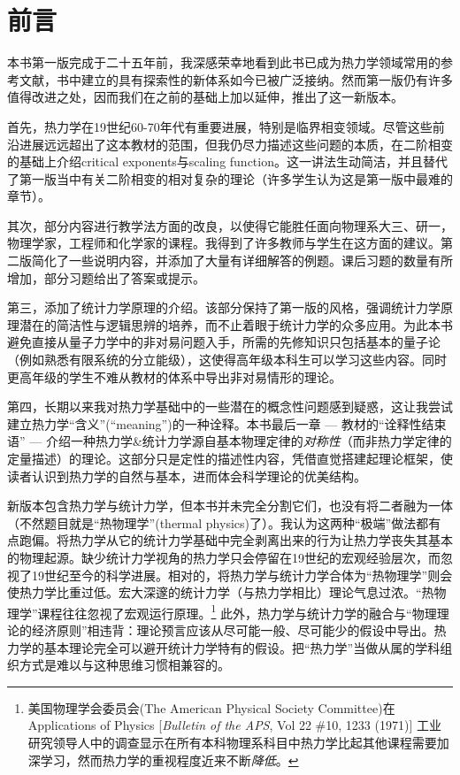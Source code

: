 

\chapter*{前言}
本书第一版完成于二十五年前，我深感荣幸地看到此书已成为热力学领域常用的参考文献，书中建立的具有探索性的新体系如今已被广泛接纳。然而第一版仍有许多值得改进之处，因而我们在之前的基础上加以延伸，推出了这一新版本。

首先，热力学在19世纪60-70年代有重要进展，特别是临界相变领域。尽管这些前沿进展远远超出了这本教材的范围，但我仍尽力描述这些问题的本质，在二阶相变的基础上介绍critical exponents与scaling function。这一讲法生动简洁，并且替代了第一版当中有关二阶相变的相对复杂的理论（许多学生认为这是第一版中最难的章节）。

其次，部分内容进行教学法方面的改良，以使得它能胜任面向物理系大三、研一，物理学家，工程师和化学家的课程。我得到了许多教师与学生在这方面的建议。第二版简化了一些说明内容，并添加了大量有详细解答的例题。课后习题的数量有所增加，部分习题给出了答案或提示。

第三，添加了统计力学原理的介绍。该部分保持了第一版的风格，强调统计力学原理潜在的简洁性与逻辑思辨的培养，而不止着眼于统计力学的众多应用。为此本书避免直接从量子力学中的非对易问题入手，所需的先修知识只包括基本的量子论（例如熟悉有限系统的分立能级），这使得高年级本科生可以学习这些内容。同时更高年级的学生不难从教材的体系中导出非对易情形的理论。

第四，长期以来我对热力学基础中的一些潜在的概念性问题感到疑惑，这让我尝试建立热力学“含义”(``meaning'')的一种诠释。本书最后一章 --- 教材的“诠释性结束语” --- 介绍一种热力学\&统计力学源自基本物理定律的{\it 对称性}（而非热力学定律的定量描述）的理论。这部分只是定性的描述性内容，凭借直觉搭建起理论框架，使读者认识到热力学的自然与基本，进而体会科学理论的优美结构。


新版本包含热力学与统计力学，但本书并未完全分割它们，也没有将二者融为一体（不然题目就是“热物理学”(thermal physics)了）。我认为这两种“极端”做法都有点跑偏。将热力学从它的统计力学基础中完全剥离出来的行为让热力学丧失其基本的物理起源。缺少统计力学视角的热力学只会停留在19世纪的宏观经验层次，而忽视了19世纪至今的科学进展。相对的，将热力学与统计力学合体为“热物理学”则会使热力学比重过低。宏大深邃的统计力学（与热力学相比）理论气息过浓。“热物理学”课程往往忽视了宏观运行原理。\footnote{美国物理学会委员会(The American Physical Society Committee)在 Applications of Physics [{\it Bulletin of the APS}, Vol 22 \#10, 1233 (1971)] 工业研究领导人中的调查显示在所有本科物理系科目中热力学比起其他课程需要加深学习，然而热力学的重视程度近来不断{\it 降低}。} 此外，热力学与统计力学的融合与“物理理论的经济原则”相违背：理论预言应该从尽可能一般、尽可能少的假设中导出。热力学的基本理论完全可以避开统计力学特有的假设。把“热力学”当做从属的学科组织方式是难以与这种思维习惯相兼容的。

